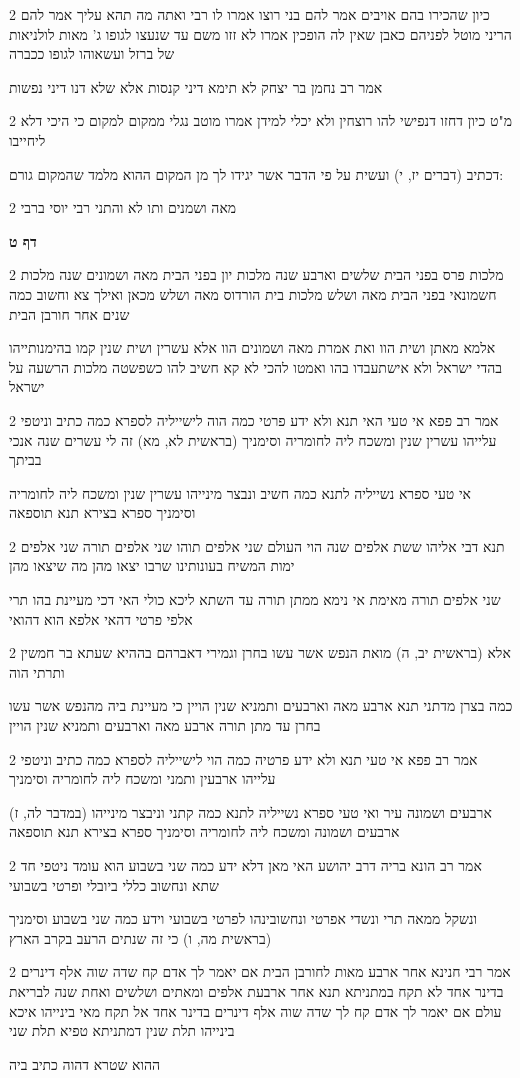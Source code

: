 \documentclass[12pt, openany]{book}
\newcommand{\sethebfont}{
\fontsize{10.5pt}{21.0pt} \selectfont
}
\newcommand{\twocol}[1]{
	{\sethebfont \begin{multicols}{2}
			#1
	\end{multicols}}	
}
\newcommand{\sectname}{}
\newcommand{\newsection}[1]{
	\addcontentsline{toc}{section}{#1}
	\renewcommand{\sectname}{#1}	
	\vspace{-\baselineskip}
	\begin{center}
		\textbf{%
\fontsize{16pt}{16pt}\selectfont
			#1}
	\end{center}
	\vspace{-\baselineskip}
	\nopagebreak
}
\begin{document}
\twocol{כיון שהכירו בהם אויבים אמר להם בני רוצו אמרו לו רבי ואתה מה תהא עליך אמר להם הריני מוטל לפניהם כאבן שאין לה הופכין אמרו לא זזו משם עד שנעצו לגופו ג' מאות לולניאות של ברזל ועשאוהו לגופו ככברה
\par אמר רב נחמן בר יצחק לא תימא דיני קנסות אלא שלא דנו דיני נפשות}
\twocol{מ"ט כיון דחזו דנפישי להו רוצחין ולא יכלי למידן אמרו מוטב נגלי ממקום למקום כי היכי דלא ליחייבו
\par דכתיב (דברים יז, י) ועשית על פי הדבר אשר יגידו לך מן המקום ההוא מלמד שהמקום גורם:}
\twocol{מאה ושמנים ותו לא והתני רבי יוסי ברבי}
\newsection{דף ט}
\twocol{מלכות פרס בפני הבית שלשים וארבע שנה מלכות יון בפני הבית מאה ושמונים שנה מלכות חשמונאי בפני הבית מאה ושלש מלכות בית הורדוס מאה ושלש מכאן ואילך צא וחשוב כמה שנים אחר חורבן הבית
\par אלמא מאתן ושית הוו ואת אמרת מאה ושמונים הוו אלא עשרין ושית שנין קמו בהימנותייהו בהדי ישראל ולא אישתעבדו בהו ואמטו להכי לא קא חשיב להו כשפשטה מלכות הרשעה על ישראל}
\twocol{אמר רב פפא אי טעי האי תנא ולא ידע פרטי כמה הוה לישייליה לספרא כמה כתיב וניטפי עלייהו עשרין שנין ומשכח ליה לחומריה וסימניך (בראשית לא, מא) זה לי עשרים שנה אנכי בביתך
\par אי טעי ספרא נשייליה לתנא כמה חשיב ונבצר מינייהו עשרין שנין ומשכח ליה לחומריה וסימניך ספרא בצירא תנא תוספאה}
\twocol{תנא דבי אליהו ששת אלפים שנה הוי העולם שני אלפים תוהו שני אלפים תורה שני אלפים ימות המשיח בעונותינו שרבו יצאו מהן מה שיצאו מהן
\par שני אלפים תורה מאימת אי נימא ממתן תורה עד השתא ליכא כולי האי דכי מעיינת בהו תרי אלפי פרטי דהאי אלפא הוא דהואי}
\twocol{אלא (בראשית יב, ה) מואת הנפש אשר עשו בחרן וגמירי דאברהם בההיא שעתא בר חמשין ותרתי הוה
\par כמה בצרן מדתני תנא ארבע מאה וארבעים ותמניא שנין הויין כי מעיינת ביה מהנפש אשר עשו בחרן עד מתן תורה ארבע מאה וארבעים ותמניא שנין הויין}
\twocol{אמר רב פפא אי טעי תנא ולא ידע פרטיה כמה הוי לישייליה לספרא כמה כתיב וניטפי עלייהו ארבעין ותמני ומשכח ליה לחומריה וסימניך
\par (במדבר לה, ז) ארבעים ושמונה עיר ואי טעי ספרא נשייליה לתנא כמה קתני וניבצר מינייהו ארבעים ושמונה ומשכח ליה לחומריה וסימניך ספרא בצירא תנא תוספאה}
\twocol{אמר רב הונא בריה דרב יהושע האי מאן דלא ידע כמה שני בשבוע הוא עומד ניטפי חד שתא ונחשוב כללי ביובלי ופרטי בשבועי
\par ונשקל ממאה תרי ונשדי אפרטי ונחשובינהו לפרטי בשבועי וידע כמה שני בשבוע וסימניך (בראשית מה, ו) כי זה שנתים הרעב בקרב הארץ}
\twocol{אמר רבי חנינא אחר ארבע מאות לחורבן הבית אם יאמר לך אדם קח שדה שוה אלף דינרים בדינר אחד לא תקח במתניתא תנא אחר ארבעת אלפים ומאתים ושלשים ואחת שנה לבריאת עולם אם יאמר לך אדם קח לך שדה שוה אלף דינרים בדינר אחד אל תקח מאי בינייהו איכא בינייהו תלת שנין דמתניתא טפיא תלת שני
\par ההוא שטרא דהוה כתיב ביה}
\end{document}
